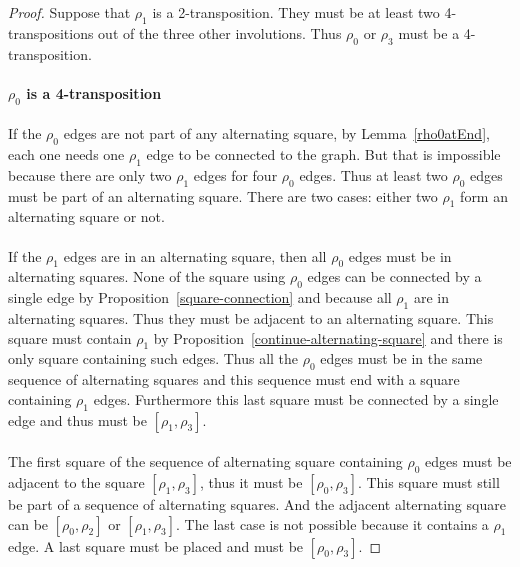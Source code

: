 \begin{proof}
  Suppose that $\rho_1$ is a 2-transposition. They must be at least two 4-transpositions out of the three other involutions. Thus $\rho_0$ or $\rho_3$ must be a 4-transposition.

  \paragraph{}
  \textbf{$\rho_0$ is a 4-transposition}

  \paragraph{}
  If the $\rho_0$ edges are not part of any alternating square, by Lemma~\ref{rho0atEnd}, each one needs one $\rho_1$ edge to be connected to the graph. But that is impossible because there are only two $\rho_1$ edges for four $\rho_0$ edges. Thus at least two $\rho_0$ edges must be part of an alternating square. There are two cases: either two $\rho_1$ form an alternating square or not.

  \paragraph{}
  If the $\rho_1$ edges are in an alternating square, then all $\rho_0$ edges must be in alternating squares. None of the square using $\rho_0$ edges can be connected by a single edge by Proposition~\ref{square-connection} and because all $\rho_1$ are in alternating squares. Thus they must be adjacent to an alternating square. This square must contain $\rho_1$ by Proposition~\ref{continue-alternating-square} and there is only square containing such edges. Thus all the $\rho_0$ edges must be in the same sequence of alternating squares and this sequence must end with a square containing $\rho_1$ edges. Furthermore this last square must be connected by a single edge and thus must be $[\rho_1, \rho_3]$.

  \paragraph{}
  The first square of the sequence of alternating square containing $\rho_0$ edges must be adjacent to the square $[\rho_1, \rho_3]$, thus it must be $[\rho_0, \rho_3]$. This square must still be part of a sequence of alternating squares. And the adjacent alternating square can be $[\rho_0, \rho_2]$ or $[\rho_1, \rho_3]$. The last case is not possible because it contains a $\rho_1$ edge. A last square must be placed and must be $[\rho_0, \rho_3]$.



\end{proof}
